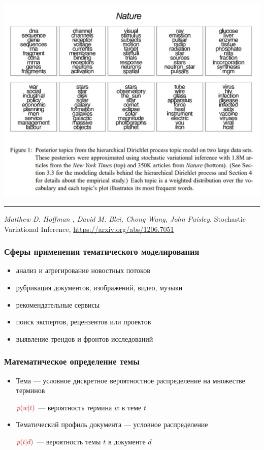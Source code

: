 \documentclass[fullscreen=true, bookmarks=true, hyperref={pdfencoding=unicode}]{beamer}
\begin{document}
\begin{frame}
  \begin{center}
    \includegraphics[keepaspectratio,
                   width=.7\paperwidth]{nature_topics.jpg}
  \end{center}

  \noindent\rule{8cm}{0.4pt}

  {\small
  {\it Matthew D. Hoffman , David M. Blei, Chong Wang, John Paisley}. Stochastic Variational Inference, \href{https://arxiv.org/abs/1206.7051}{https://arxiv.org/abs/1206.7051}}
\end{frame}


\begin{frame}
  \frametitle{Сферы применения тематического моделирования}

  \begin{itemize}
    \item анализ и агрегирование новостных потоков
    \item рубрикация документов, изображений, видео, музыки
    \item рекомендательные сервисы
    \item поиск экспертов, рецензентов или проектов
    \item выявление трендов и фронтов исследований
  \end{itemize}
\end{frame}


\begin{frame}
  \frametitle{Математическое определение темы}

  \begin{itemize}
    \item Тема — условное дискретное вероятностное распределение на множестве терминов

          $\color{red}{p(w | t)}$ — вероятность термина $w$ в теме $t$

    \item Тематический профиль документа — условное распределение

          $\color{red}{p(t | d)}$ — вероятность темы $t$ в документе $d$
  \end{itemize}
\end{frame}
\end{document}
